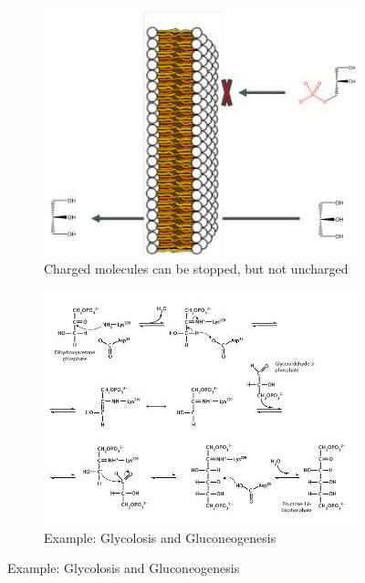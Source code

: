 \documentclass[]{article}
\begin{document}
\begin{figure}[H]
	\caption{Phosphates allow physical Compartmentalization}\label{fig:Compartmentalization}
	\begin{subfigure}[t]{0.35\textwidth}
		\caption{Charged molecules can be stopped, but not uncharged}
		\includegraphics[width=\textwidth]{Compartmentalization}
	\end{subfigure}\;
	\begin{subfigure}[t]{0.5\textwidth}
		\caption{Example: Glycolosis and Gluconeogenesis }\label{fig:CompartmentalizationExample}
		\includegraphics[width=\textwidth]{CompartmentalizationExample}
	\end{subfigure}
\end{figure}
\end{document}
